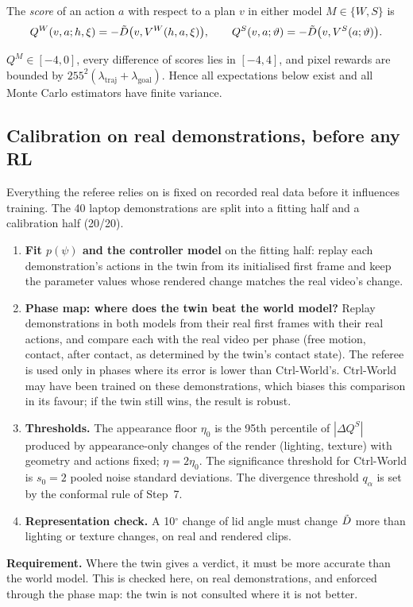The \emph{score} of an action $a$ with respect to a plan $v$ in either model $M\in\{W,S\}$ is
\begin{equation}
Q^W(v,a;h,\xi)=-\tilde D\big(v,V^{W}(h,a,\xi)\big),\qquad Q^S(v,a;\vartheta)=-\tilde D\big(v,V^{S}(a;\vartheta)\big).
\end{equation}

\begin{lemma}\label{method:lem:bound}
$Q^M\in[-4,0]$, every difference of scores lies in $[-4,4]$, and pixel rewards are bounded by $255^2(\lambda_{\mathrm{traj}}+\lambda_{\mathrm{goal}})$. Hence all expectations below exist and all Monte Carlo estimators have finite variance.
\end{lemma}

\subsection{Calibration on real demonstrations, before any RL}\label{method:sec:calib}
Everything the referee relies on is fixed on recorded real data before it influences training. The 40 laptop demonstrations are split into a fitting half and a calibration half (20/20).
\begin{enumerate}[label=5.\arabic*]
\item \textbf{Fit $p(\psi)$ and the controller model} on the fitting half: replay each demonstration's actions in the twin from its initialised first frame and keep the parameter values whose rendered change matches the real video's change.
\item \textbf{Phase map: where does the twin beat the world model?} Replay demonstrations in both models from their real first frames with their real actions, and compare each with the real video per phase (free motion, contact, after contact, as determined by the twin's contact state). The referee is used only in phases where its error is lower than Ctrl-World's. Ctrl-World may have been trained on these demonstrations, which biases this comparison in its favour; if the twin still wins, the result is robust.
\item \textbf{Thresholds.} The appearance floor $\eta_0$ is the 95th percentile of $|\Delta Q^S|$ produced by appearance-only changes of the render (lighting, texture) with geometry and actions fixed; $\eta=2\eta_0$. The significance threshold for Ctrl-World is $s_0=2$ pooled noise standard deviations. The divergence threshold $q_\alpha$ is set by the conformal rule of Step~7.
\item \textbf{Representation check.} A 10$^\circ$ change of lid angle must change $\tilde D$ more than lighting or texture changes, on real and rendered clips.
\end{enumerate}
\begin{why}
\textbf{Requirement.} Where the twin gives a verdict, it must be more accurate than the world model. This is checked here, on real demonstrations, and enforced through the phase map: the twin is not consulted where it is not better.
\end{why}

